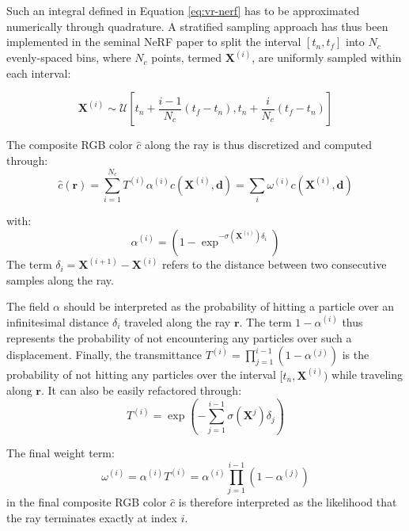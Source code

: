 Such an integral defined in Equation \eqref{eq:vr-nerf} has to be approximated numerically through quadrature. A stratified sampling approach has thus been implemented in the seminal \ac{NeRF} paper \citep{mildenhall2020nerf} to split the interval $[t_{n},t_{f}]$ into $N_c$ evenly-spaced bins, where $N_c$ points, termed $\mathbf{X}^{(i)}$, are uniformly sampled within each interval: 

\begin{equation}
  \mathbf{X}^{(i)} \sim \mathcal{U}\left[ t_{n} + \frac{i-1}{N_c}(t_{f} - t_{n}),t_{n} + \frac{i}{N_c}(t_{f} - t_{n}) \right]
\end{equation}

The composite RGB color $\hat{c}$ along the ray is thus discretized and computed through: 
\begin{equation}
\label{eq:main_nerf}
\hat{c}(\mathbf{r})  = \sum_{i=1}^{N_c}T^{(i)}\alpha^{(i)}c(\mathbf{X}^{(i)},\mathbf{d}) = \sum_{i} \omega^{(i)}c(\mathbf{X}^{(i)},\mathbf{d})
\end{equation}

\noindent with: 
\begin{equation}
\alpha^{(i)} = (1-\exp^{-\sigma(\mathbf{X}^{(i)})\delta_{i}})
\end{equation}
The term $\delta_{i} = \mathbf{X}^{(i+1)} - \mathbf{X}^{(i)} $ refers to the distance between two consecutive samples along the ray.

The field $\alpha$ should be interpreted as the probability of hitting a particle over an infinitesimal distance $\delta_{i}$ traveled along the ray $\mathbf{r}$. The term $1 - \alpha^{(i)}$ thus represents the probability of not encountering any particles over such a displacement. Finally, the transmittance $T^{(i)} = \prod_{j=1}^{i-1}(1-\alpha^{(j)})$ is the probability of not hitting any particles over the interval $[t_{n}, \mathbf{X}^{(i)})$ while traveling along $\mathbf{r}$. It can also be easily refactored through: 
\begin{equation}
T^{(i)} = \exp\left( - \sum_{j=1}^{i-1}\sigma(\mathbf{X}^{j})\delta_{j}\right)
\end{equation}

The final weight term: 
\begin{equation}
\label{eq:weights}
    \omega^{(i)} = \alpha^{(i)}T^{(i)} = \alpha^{(i)}\prod_{j=1}^{i-1}(1-\alpha^{(j)})
\end{equation}
in the final composite RGB color $\hat{c}$ is therefore interpreted as the likelihood that the ray terminates exactly at index $i$. 

